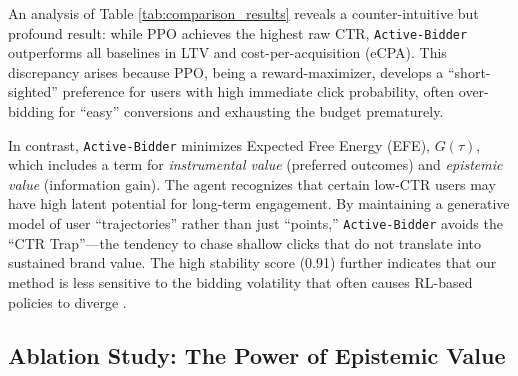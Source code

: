 \begin{table}[h]
\centering
\caption{\textbf{Performance Comparison across Metric Categories.} Values represent the mean $\pm$ standard deviation over 10 independent runs. LTV is normalized to the LinUCB baseline.}
\label{tab:comparison_results}
%
\end{table}

An analysis of Table \ref{tab:comparison_results} reveals a counter-intuitive but profound result: while PPO achieves the highest raw CTR, \texttt{Active-Bidder} outperforms all baselines in LTV and cost-per-acquisition (eCPA). This discrepancy arises because PPO, being a reward-maximizer, develops a ``short-sighted'' preference for users with high immediate click probability, often over-bidding for ``easy'' conversions and exhausting the budget prematurely.

In contrast, \texttt{Active-Bidder} minimizes Expected Free Energy (EFE), $G(\tau)$, which includes a term for \textit{instrumental value} (preferred outcomes) and \textit{epistemic value} (information gain). The agent recognizes that certain low-CTR users may have high latent potential for long-term engagement. By maintaining a generative model of user ``trajectories'' rather than just ``points,'' \texttt{Active-Bidder} avoids the ``CTR Trap''—the tendency to chase shallow clicks that do not translate into sustained brand value. The high stability score (0.91) further indicates that our method is less sensitive to the bidding volatility that often causes RL-based policies to diverge \cite{zhao2018deep}.

\subsection{Ablation Study: The Power of Epistemic Value}

